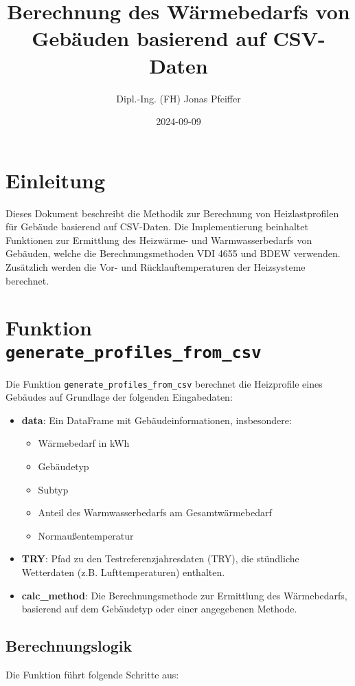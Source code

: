 \documentclass[a4paper,12pt]{article}
\title{Berechnung des Wärmebedarfs von Gebäuden basierend auf CSV-Daten}
\author{Dipl.-Ing. (FH) Jonas Pfeiffer}
\date{2024-09-09}
\begin{document}
\maketitle

\section{Einleitung}
Dieses Dokument beschreibt die Methodik zur Berechnung von Heizlastprofilen für Gebäude basierend auf CSV-Daten. Die Implementierung beinhaltet Funktionen zur Ermittlung des Heizwärme- und Warmwasserbedarfs von Gebäuden, welche die Berechnungsmethoden VDI 4655 und BDEW verwenden. Zusätzlich werden die Vor- und Rücklauftemperaturen der Heizsysteme berechnet.

\section{Funktion \texttt{generate\_profiles\_from\_csv}}

Die Funktion \texttt{generate\_profiles\_from\_csv} berechnet die Heizprofile eines Gebäudes auf Grundlage der folgenden Eingabedaten:

\begin{itemize}
    \item \textbf{data}: Ein DataFrame mit Gebäudeinformationen, insbesondere:
    \begin{itemize}
        \item Wärmebedarf in kWh
        \item Gebäudetyp
        \item Subtyp
        \item Anteil des Warmwasserbedarfs am Gesamtwärmebedarf
        \item Normaußentemperatur
    \end{itemize}
    \item \textbf{TRY}: Pfad zu den Testreferenzjahresdaten (TRY), die stündliche Wetterdaten (z.B. Lufttemperaturen) enthalten.
    \item \textbf{calc\_method}: Die Berechnungsmethode zur Ermittlung des Wärmebedarfs, basierend auf dem Gebäudetyp oder einer angegebenen Methode.
\end{itemize}

\subsection{Berechnungslogik}
Die Funktion führt folgende Schritte aus:
\end{document}
